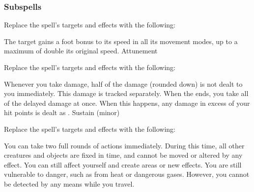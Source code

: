 \subsubsection{Subspells}
Replace the spell's targets and effects with the following:
\begin{spellcontent}
\begin{augmenttargetinginfo}
\end{augmenttargetinginfo}
\begin{augmenteffects}
\spelleffect
The target gains a  foot bonus to its speed in all its movement modes, up to a maximum of double its original speed.
\spelldur Attunement
\end{augmenteffects}
\end{spellcontent}
Replace the spell's targets and effects with the following:
\begin{spellcontent}
\begin{augmenttargetinginfo}
\end{augmenttargetinginfo}
\begin{augmenteffects}
\spelleffect
Whenever you take damage, half of the damage (rounded down) is not dealt to you immediately.
This damage is tracked separately.
When the ends, you take all of the delayed damage at once.
When this happens, any damage in excess of your hit points is dealt as .
\spelldur Sustain (minor)
\end{augmenteffects}
\end{spellcontent}
Replace the spell's targets and effects with the following:
\begin{spellcontent}
\begin{augmenttargetinginfo}
\end{augmenttargetinginfo}
\begin{augmenteffects}
\spelleffect
You can take two full rounds of actions immediately.
During this time, all other creatures and objects are fixed in time, and cannot be moved or altered by any effect.
You can still affect yourself and create areas or new effects.
You are still vulnerable to danger, such as from heat or dangerous gases. However, you cannot be detected by any means while you travel.
\end{augmenteffects}
\end{spellcontent}
